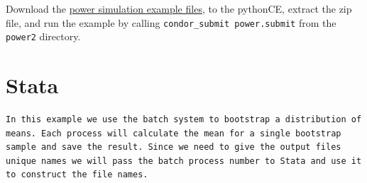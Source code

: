 \documentclass[]{book}
\begin{document}
\begin{enumerate}
  Download the \href{examples_Python/power2.zip}{power simulation
  example files}, to the pythonCE, extract the zip file, and run the
  example by calling \texttt{condor\_submit\ power.submit} from the
  \texttt{power2} directory.
\end{enumerate}

\section{Stata}\label{stata}

\begin{verbatim}
In this example we use the batch system to bootstrap a distribution of
means. Each process will calculate the mean for a single bootstrap
sample and save the result. Since we need to give the output files
unique names we will pass the batch process number to Stata and use it
to construct the file names.
\end{verbatim}
\end{document}

